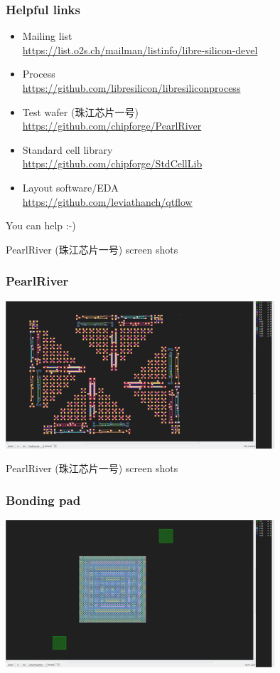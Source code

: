 \documentclass{beamer}
\begin{document}
\begin{frame}
\frametitle{Helpful links}
\begin{itemize}
	\item Mailing list \\
		\url{https://list.o2s.ch/mailman/listinfo/libre-silicon-devel}
	\item Process \\
		\url{https://github.com/libresilicon/libresiliconprocess}
	\item Test wafer (珠江芯片一号) \\
		\url{https://github.com/chipforge/PearlRiver}
	\item Standard cell library \\
		\url{https://github.com/chipforge/StdCellLib}
	\item Layout software/EDA \\
		\url{https://github.com/leviathanch/qtflow}
\end{itemize}
\Huge{\centerline{You can help :-)}}
\end{frame}

\begin{frame}{PearlRiver (珠江芯片一号) screen shots}
	\frametitle{PearlRiver}
	\centering
	\includegraphics[width=0.75\textwidth]{Screenshot_20180929_015838.png}
\end{frame}

\begin{frame}{PearlRiver (珠江芯片一号) screen shots}
	\frametitle{Bonding pad}
	\centering
	\includegraphics[width=0.75\textwidth]{Screenshot_20180929_020016.png}
\end{frame}
\end{document}
